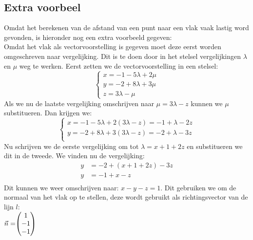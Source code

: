 \subsection{Extra voorbeel}
Omdat het berekenen van de afstand van een punt naar een vlak vaak lastig word gevonden, is hieronder nog een extra voorbeeld gegeven: \\

Omdat het vlak als vectorvoorstelling is gegeven moet deze eerst worden omgeschreven naar vergelijking. Dit is te doen door in het stelsel vergelijkingen $\lambda$ en $\mu$ weg te werken.
Eerst zetten we de vectorvoorstelling in een stelsel:
\[\begin{cases}
x = -1 -5\lambda + 2\mu\\
y = -2 + 8\lambda + 3\mu\\
z = 3\lambda - \mu  
\end{cases}
\] 
Als we nu de laatste vergelijking omschrijven naar $\mu = 3\lambda-z$ kunnen we $\mu$ substitueren. Dan krijgen we:
\[\begin{cases}
x = -1 -5\lambda + 2(3\lambda-z) = -1 + \lambda -2z\\
y = -2 + 8\lambda + 3(3\lambda-z) = -2 + \lambda - 3z\\
\end{cases}
\] 
Nu schrijven we de eerste vergelijking om tot $\lambda = x + 1 + 2z$ en substitueren we dit in de tweede. We vinden nu de vergelijking: 
\begin{align*}
    y &= -2+(x+1+2z) -3z \\
    y &= -1 + x - z \\
\end{align*}
Dit kunnen we weer omschrijven naar: $x-y-z=1$. Dit gebruiken we om de normaal van het vlak op te stellen, deze wordt gebruikt als richtingsvector van de lijn $l$: \\
    $ \vec{n} = \vecdrie{1}{-1}{-1}  $  
    
